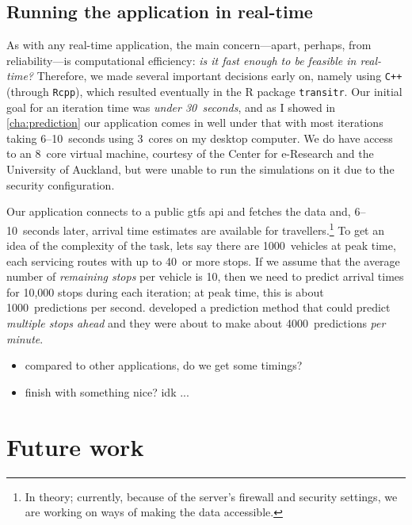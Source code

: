 \subsection{Running the application in real-time}

As with any real-time application, the main concern---apart, perhaps, from reliability---is computational efficiency: \emph{is it fast enough to be feasible in real-time?} Therefore, we made several important decisions early on, namely using {\tt C++} (through {\tt Rcpp}), which resulted eventually in the R package {\tt transitr}. Our initial goal for an iteration time was \emph{under 30~seconds}, and as I showed in \cref{cha:prediction} our application comes in well under that with most iterations taking 6--10~seconds using 3~cores on my desktop computer. We do have access to an 8~core virtual machine, courtesy of the Center for e-Research and the University of Auckland, but were unable to run the simulations on it due to the security configuration.


Our application connects to a public \gls{gtfs} \gls{api} and fetches the data and, 6--10~seconds later, arrival time estimates are available for travellers.\footnote{In theory; currently, because of the server's firewall and security settings, we are working on ways of making the data accessible.} To get an idea of the complexity of the task, lets say there are 1000~vehicles at peak time, each servicing routes with up to 40~or more stops. If we assume that the average number of \emph{remaining stops} per vehicle is 10, then we need to predict arrival times for 10,000 stops during each iteration; at peak time, this is about 1000~predictions per second. \citet{Chang_2010} developed a prediction method that could predict \emph{multiple stops ahead} and they were about to make about 4000~predictions \emph{per minute}.

\begin{itemize}
  \item compared to other applications, do we get some timings?
  \item finish with something nice? idk ...
\end{itemize}



\section{Future work}

